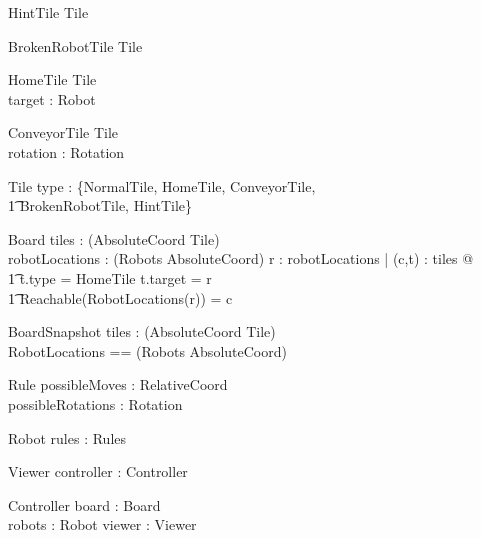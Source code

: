 \documentclass[12pt]{article}
\begin{document}
\begin{schema}{HintTile}
Tile
\end{schema}

\begin{schema}{BrokenRobotTile}
Tile
\end{schema}

\begin{schema}{HomeTile}
Tile \\
target : Robot
\end{schema}

\begin{schema}{ConveyorTile}
Tile \\
rotation : Rotation
\end{schema}

\begin{schema}{Tile}
type : \{NormalTile, HomeTile, ConveyorTile, \\ \t1 BrokenRobotTile, HintTile\}
\end{schema}

\begin{schema}{Board}
tiles : \power (AbsoluteCoord \fun Tile) \\
robotLocations : \power (Robots \fun AbsoluteCoord)
\where
\forall r : \dom robotLocations | \exists (c,t) : tiles @  \\ \t1 t.type = HomeTile \wedge t.target = r \wedge \\ \t1 Reachable(RobotLocations(r)) = c
\end{schema}

\begin{schema}{BoardSnapshot}
tiles : \power (AbsoluteCoord \fun Tile) \\
RobotLocations == \power (Robots \fun AbsoluteCoord)
\end{schema}

\begin{schema}{Rule}
possibleMoves : \power RelativeCoord \\
possibleRotations : \power Rotation
\end{schema}

\begin{schema}{Robot}
rules : Rules
\end{schema}

\begin{schema}{Viewer}
controller : Controller
\end{schema}

\begin{schema}{Controller}
board : Board \\
robots : \power Robot
viewer : Viewer
\end{schema}
\end{document}

